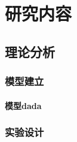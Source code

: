 \documentclass{document}
\begin{document}


\chapter{研究内容}
\section{理论分析}
\subsection{模型建立}
\subsubsection{模型dada}
\subsection{实验设计}


\end{document}

